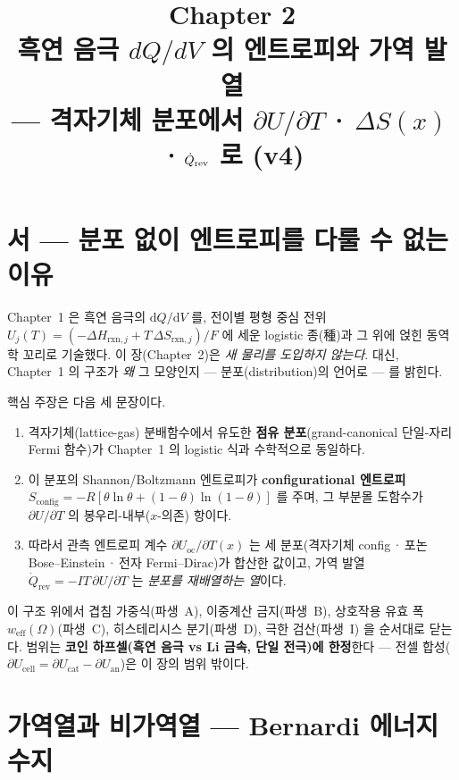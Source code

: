 \documentclass[11pt,a4paper]{article}
\title{\textbf{\LARGE Chapter 2}\\[0.35em]
  \Large 흑연 음극 $dQ/dV$ 의 엔트로피와 가역 발열\\[0.2em]
  \large --- 격자기체 분포에서 $\partial U/\partial T$\,·$\,\Delta S(x)$\,·$\,\dot Q_\rev$ 로 (v4)}
\author{}\date{}
\newcommand{\dd}{\mathrm{d}}
\newcommand{\rxn}{\mathrm{rxn}}
\newcommand{\rev}{\mathrm{rev}}
\newcommand{\oc}{\mathrm{oc}}
\newcommand{\config}{\mathrm{config}}
\newcommand{\eff}{\mathrm{eff}}
\begin{document}
\maketitle
\tableofcontents
\bigskip

\section*{서 — 분포 없이 엔트로피를 다룰 수 없는 이유}

Chapter~1 은 흑연 음극의 $\dd Q/\dd V$ 를, 전이별 평형 중심 전위
$U_j(T)=(-\Delta H_{\rxn,j}+T\,\Delta S_{\rxn,j})/F$ 에 세운 logistic 종(種)과
그 위에 얹힌 동역학 꼬리로 기술했다. 이 장(Chapter~2)은 \emph{새 물리를 도입하지
않는다}. 대신, Chapter~1 의 구조가 \emph{왜} 그 모양인지 --- 분포(distribution)의
언어로 --- 를 밝힌다.

핵심 주장은 다음 세 문장이다.
\begin{enumerate}[leftmargin=1.6em,itemsep=3pt]
\item 격자기체(lattice-gas) 분배함수에서 유도한 \textbf{점유 분포}(grand-canonical
  단일-자리 Fermi 함수)가 Chapter~1 의 logistic 식과 수학적으로 동일하다.
\item 이 분포의 Shannon/Boltzmann 엔트로피가 \textbf{configurational 엔트로피}
  $S_\config=-R[\theta\ln\theta+(1-\theta)\ln(1-\theta)]$ 를 주며, 그 부분몰 도함수가
  $\partial U/\partial T$ 의 봉우리-내부($x$-의존) 항이다.
\item 따라서 관측 엔트로피 계수 $\partial U_\oc/\partial T(x)$ 는 세 분포(격자기체
  config\,·\,포논 Bose--Einstein\,·\,전자 Fermi--Dirac)가 합산한 값이고,
  가역 발열 $\dot Q_\rev=-IT\,\partial U/\partial T$ 는 \emph{분포를 재배열하는 열}이다.
\end{enumerate}

이 구조 위에서 겹침 가중식(파생~A), 이중계산 금지(파생~B), 상호작용 유효 폭
$w_\eff(\Omega)$(파생~C), 히스테리시스 분기(파생~D), 극한 검산(파생~I) 을 순서대로
닫는다. 범위는 \textbf{코인 하프셀(흑연 음극 vs Li 금속, 단일 전극)에 한정}한다 ---
전셀 합성($\partial U_\text{cell}=\partial U_\text{cat}-\partial U_\text{an}$)은 이 장의
범위 밖이다.

\section{가역열과 비가역열 — Bernardi 에너지 수지}\label{sec:bernardi}
\end{document}
